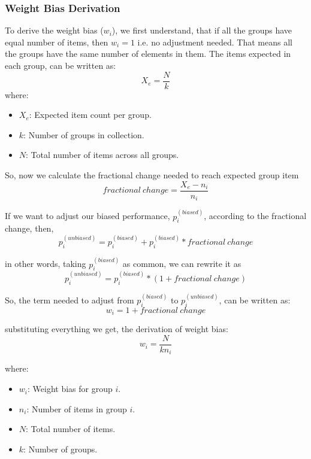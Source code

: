 \documentclass[a4paper,fleqn,review]{cas-sc}
\begin{document}
\subsubsection{Weight Bias Derivation}
To derive the weight bias ($w_i$), we first understand, that if all the groups have equal number of items, then $w_i = 1$ i.e. no adjustment needed. That means all the groups have the same number of elements in them. The items expected in each group, can be written as:
\begin{equation}
X_e = \frac{N}{k}
\end{equation}
where:
\begin{itemize}
    \item $X_e$: Expected item count per group.
    \item $k$: Number of groups in collection.
    \item $N$: Total number of items across all groups.
\end{itemize}

So, now we calculate the fractional change needed to reach expected group item
\begin{equation}
 fractional \ change = \frac{X_e - n_i}{n_i}
\end{equation}

If we want to adjust our biased performance, $p_i^{(biased)}$, according to the fractional change, 
then,
\begin{equation}
    p_i^{(unbiased)} = p_i^{(biased)} +  p_i^{(biased)} *  fractional \ change
\end{equation}

in other words, taking $p_i^{(biased)}$ as common, we can rewrite it as
\begin{equation}
    p_i^{(unbiased)} = p_i^{(biased)} * (1 +  fractional \ change)
\label{eq:p-unbiased}
\end{equation}

So, the term needed to adjust from $p_i^{(biased)}$ to $p_i^{(unbiased)}$, can be written as:
\begin{equation}
    w_i = 1 + fractional \ change
\end{equation}

substituting everything we get, the derivation of weight bias:
\begin{equation}
    w_i = \frac{N}{kn_i}
\label{eq:weight-bias}
\end{equation}

where:
\begin{itemize}
    \item $w_i$: Weight bias for group $i$.
    \item $n_i$: Number of items in group $i$.
    \item $N$: Total number of items.
    \item $k$: Number of groups.
\end{itemize}
\end{document}
